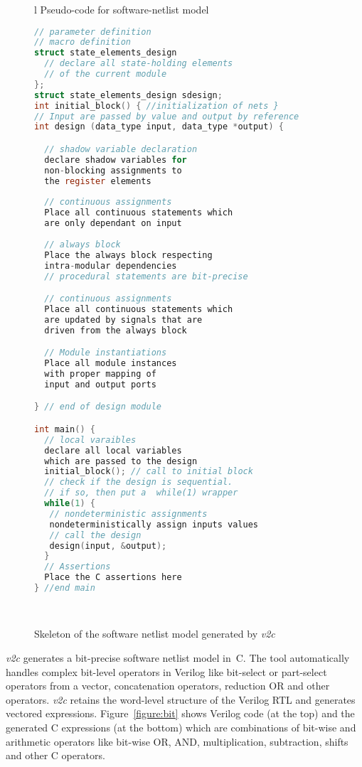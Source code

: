 \begin{figure}[t]
\tiny
\begin{tabular}{l}
\hline
 Pseudo-code for software-netlist model \\
\hline
\begin{lstlisting}[mathescape=true,language=C]
// parameter definition
// macro definition
struct state_elements_design
  // declare all state-holding elements
  // of the current module 
};
struct state_elements_design sdesign;
int initial_block() { //initialization of nets }
// Input are passed by value and output by reference
int design (data_type input, data_type *output) {

  // shadow variable declaration
  declare shadow variables for 
  non-blocking assignments to 
  the register elements  
  
  // continuous assignments
  Place all continuous statements which 
  are only dependant on input
 
  // always block 
  Place the always block respecting
  intra-modular dependencies
  // procedural statements are bit-precise

  // continuous assignments
  Place all continuous statements which 
  are updated by signals that are 
  driven from the always block

  // Module instantiations 
  Place all module instances 
  with proper mapping of 
  input and output ports

} // end of design module

int main() {
  // local varaibles 
  declare all local variables 
  which are passed to the design 
  initial_block(); // call to initial block
  // check if the design is sequential.
  // if so, then put a  while(1) wrapper
  while(1) {
   // nondeterministic assignments
   nondeterministically assign inputs values  
   // call the design
   design(input, &output);
  }
  // Assertions 
  Place the C assertions here 
} //end main 
\end{lstlisting}
\\
\hline
\end{tabular}
\caption{Skeleton of the software netlist model generated by \emph{v2c}}
\label{figure:structure}
\end{figure}

\emph{v2c} generates a bit-precise software netlist model in~C.  The tool
automatically handles complex bit-level operators in Verilog like
bit-select or part-select operators from a vector, concatenation operators,
reduction OR and other operators.  \emph{v2c} retains the word-level structure 
of the Verilog RTL and generates vectored expressions. 
Figure~\ref{figure:bit} shows Verilog code (at the top) and the generated C
expressions (at the bottom) which are combinations of bit-wise and
arithmetic operators like bit-wise OR, AND, multiplication, subtraction,
shifts and other C operators.

